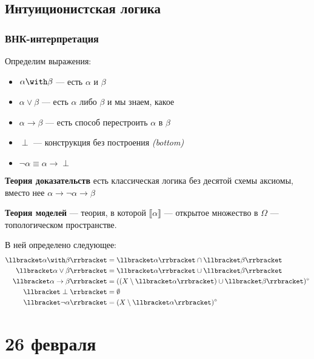 \documentclass[12pt, a4paper, oneside]{book}
\begin{document}
\section{Интуиционистская логика}

\subsection{ВНК-интерпретация}

Определим выражения:
\begin{itemize}
    \item \(\alpha \with \beta\) --- есть \(\alpha\) и \(\beta\)
    \item \(\alpha \lor \beta\) --- есть \(\alpha\) либо \(\beta\) и мы знаем, какое
    \item \(\alpha \to \beta\) --- есть способ перестроить \(\alpha\) в \(\beta\)
    \item \(\perp\) --- конструкция без построения \textit{(bottom)}
    \item \(\neg \alpha \equiv \alpha \to \perp\)
\end{itemize}

\textbf{Теория доказательств} есть классическая логика без десятой схемы аксиомы, вместо нее \(\alpha \to \neg \alpha \to \beta\)

\textbf{Теория моделей} --- теория, в которой \(\llbracket \alpha \rrbracket\) --- открытое множество в \(\Omega\) --- топологическом пространстве.

В ней определено следующее:
\begin{align*}
    \llbracket \alpha \with \beta \rrbracket & = \llbracket \alpha \rrbracket \cap \llbracket \beta \rrbracket                       \\
    \llbracket \alpha \lor \beta \rrbracket  & = \llbracket \alpha \rrbracket \cup \llbracket \beta \rrbracket                       \\
    \llbracket \alpha \to \beta \rrbracket   & = ((X \setminus \llbracket \alpha \rrbracket) \cup \llbracket \beta \rrbracket)^\circ \\
    \llbracket \perp \rrbracket              & = \emptyset                                                                           \\
    \llbracket \neg \alpha \rrbracket        & = (X \setminus \llbracket \alpha\rrbracket)^\circ
\end{align*}

\chapter{26 февраля}
\end{document}
